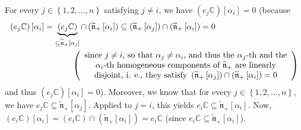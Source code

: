 \documentclass[etingof-lie.tex]{subfiles}
\begin{document}
\begin{verlong}
For every $j\in\left\{  1,2,...,n\right\}  $ satisfying $j\neq i$, we have
$\left(  e_{j}\mathbb{C}\right)  \left[  \alpha_{i}\right]  =0$ (because
\begin{align*}
\left(  e_{j}\mathbb{C}\right)  \left[  \alpha_{i}\right]   &
=\underbrace{\left(  e_{j}\mathbb{C}\right)  }_{\subseteq
\widetilde{\mathfrak{n}}_{+}\left[  \alpha_{j}\right]  }\cap\left(
\widetilde{\mathfrak{n}}_{+}\left[  \alpha_{i}\right]  \right)  \subseteq
\left(  \widetilde{\mathfrak{n}}_{+}\left[  \alpha_{j}\right]  \right)
\cap\left(  \widetilde{\mathfrak{n}}_{+}\left[  \alpha_{i}\right]  \right)
=0\\
&  \ \ \ \ \ \ \ \ \ \ \left(
\begin{array}
[c]{c}%
\text{since }j\neq i\text{, so that }\alpha_{j}\neq\alpha_{i}\text{, and thus
the }\alpha_{j}\text{-th and the}\\
\alpha_{i}\text{-th homogeneous components of }\widetilde{\mathfrak{n}}%
_{+}\text{ are linearly}\\
\text{disjoint, i. e., they satisfy }\left(  \widetilde{\mathfrak{n}}%
_{+}\left[  \alpha_{j}\right]  \right)  \cap\left(  \widetilde{\mathfrak{n}%
}_{+}\left[  \alpha_{i}\right]  \right)  =0
\end{array}
\right)
\end{align*}
and thus $\left(  e_{j}\mathbb{C}\right)  \left[  \alpha_{i}\right]  =0$).
Moreover, we know that for every $j\in\left\{  1,2,...,n\right\}  $, we have
$e_{j}\mathbb{C}\subseteq\widetilde{\mathfrak{n}}_{+}\left[  \alpha
_{j}\right]  $. Applied to $j=i$, this yields $e_{i}\mathbb{C}\subseteq
\widetilde{\mathfrak{n}}_{+}\left[  \alpha_{i}\right]  $. Now, $\left(
e_{i}\mathbb{C}\right)  \left[  \alpha_{i}\right]  =\left(  e_{i}%
\mathbb{C}\right)  \cap\left(  \widetilde{\mathfrak{n}}_{+}\left[  \alpha
_{i}\right]  \right)  =e_{i}\mathbb{C}$ (since $e_{i}\mathbb{C}\subseteq
\widetilde{\mathfrak{n}}_{+}\left[  \alpha_{i}\right]  $).


\end{verlong}
\end{document}
